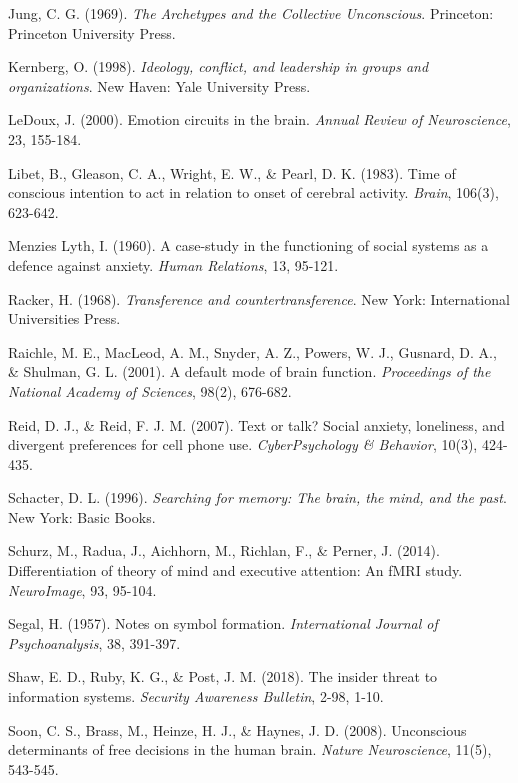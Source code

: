 \documentclass[11pt,a4paper]{article}
\begin{document}
\begin{thebibliography}{99}
Jung, C. G. (1969). \textit{The Archetypes and the Collective Unconscious}. Princeton: Princeton University Press.

Kernberg, O. (1998). \textit{Ideology, conflict, and leadership in groups and organizations}. New Haven: Yale University Press.

LeDoux, J. (2000). Emotion circuits in the brain. \textit{Annual Review of Neuroscience}, 23, 155-184.

Libet, B., Gleason, C. A., Wright, E. W., \& Pearl, D. K. (1983). Time of conscious intention to act in relation to onset of cerebral activity. \textit{Brain}, 106(3), 623-642.

Menzies Lyth, I. (1960). A case-study in the functioning of social systems as a defence against anxiety. \textit{Human Relations}, 13, 95-121.

Racker, H. (1968). \textit{Transference and countertransference}. New York: International Universities Press.

Raichle, M. E., MacLeod, A. M., Snyder, A. Z., Powers, W. J., Gusnard, D. A., \& Shulman, G. L. (2001). A default mode of brain function. \textit{Proceedings of the National Academy of Sciences}, 98(2), 676-682.

Reid, D. J., \& Reid, F. J. M. (2007). Text or talk? Social anxiety, loneliness, and divergent preferences for cell phone use. \textit{CyberPsychology \& Behavior}, 10(3), 424-435.

Schacter, D. L. (1996). \textit{Searching for memory: The brain, the mind, and the past}. New York: Basic Books.

Schurz, M., Radua, J., Aichhorn, M., Richlan, F., \& Perner, J. (2014). Differentiation of theory of mind and executive attention: An fMRI study. \textit{NeuroImage}, 93, 95-104.

Segal, H. (1957). Notes on symbol formation. \textit{International Journal of Psychoanalysis}, 38, 391-397.

Shaw, E. D., Ruby, K. G., \& Post, J. M. (2018). The insider threat to information systems. \textit{Security Awareness Bulletin}, 2-98, 1-10.

Soon, C. S., Brass, M., Heinze, H. J., \& Haynes, J. D. (2008). Unconscious determinants of free decisions in the human brain. \textit{Nature Neuroscience}, 11(5), 543-545.


\end{thebibliography}
\end{document}
